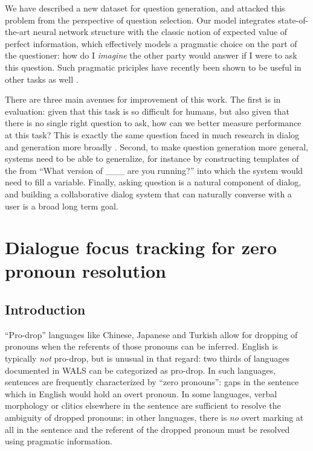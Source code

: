 \documentclass[11pt]{report}
\renewcommand\cite{\citep}	%
\begin{document}
We have described a new dataset for question generation, and attacked this problem from the perspective of question selection.
Our model integrates state-of-the-art neural network structure with the classic notion of expected value of perfect information, which effectively models a pragmatic choice on the part of the questioner: how do I \emph{imagine} the other party would answer if I were to ask this question. Such pragmatic priciples have recently been shown to be useful in other tasks as well \cite{golland2010game,smith2013learning,orita2015discourse,andreas2016reasoning}.

There are three main avenues for improvement of this work.
The first is in evaluation: given that this task is so difficult for humans, but also given that there is no single right question to ask, how can we better measure performance at this task?
This is exactly the same question faced in much research in dialog and generation more broadly \cite{paek2001empirical,lowe2015ubuntu,liu2016not,kannan2017adversarial}.
Second, to make question generation more general, systems need to be able to generalize, for instance by constructing templates of the from ``What version of \_\_\_ are you running?'' into which the system would need to fill a variable. Finally, asking question is a natural component of dialog, and building a collaborative dialog system that can naturally converse with a user is a broad long term goal.

\newpage

\chapter{Dialogue focus tracking for zero pronoun resolution}\label{dialogue_focus_tracking}

\section{Introduction}

``Pro-drop'' languages like Chinese, Japanese and Turkish allow for dropping of pronouns when the referents of those pronouns can be inferred. English is typically 
\emph{not} pro-drop, but is unusual in that regard: two thirds of languages documented in WALS \cite{wals} can be categorized as pro-drop. In such languages, sentences are frequently characterized by ``zero pronouns'': gaps in the sentence which in English would hold an overt pronoun. In some languages, verbal morphology or clitics elsewhere in the sentence are sufficient to resolve the ambiguity of dropped pronouns; in other languages, there is \emph{no} overt marking at all in the sentence and the referent of the dropped pronoun must be resolved using pragmatic information.
\end{document}
